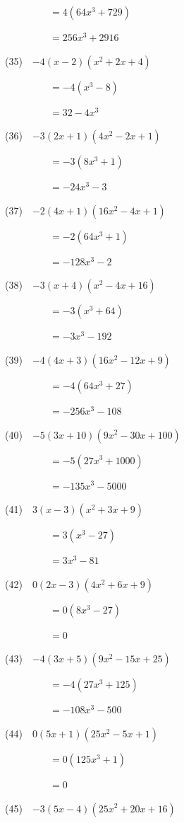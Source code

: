 \documentclass[a4j,twocolumn,10pt,fleqn]{jarticle}
\begin{document}
~~~~~~~~~$=4(64 x^{3} + 729)$

~~~~~~~~~$=256 x^{3} + 2916$

(35)~~$-4\left(x - 2\right) \left(x^{2} + 2 x + 4\right)$

~~~~~~~~~$=-4(x^{3} - 8)$

~~~~~~~~~$=32 - 4 x^{3}$

(36)~~$-3\left(2 x + 1\right) \left(4 x^{2} - 2 x + 1\right)$

~~~~~~~~~$=-3(8 x^{3} + 1)$

~~~~~~~~~$=- 24 x^{3} - 3$

(37)~~$-2\left(4 x + 1\right) \left(16 x^{2} - 4 x + 1\right)$

~~~~~~~~~$=-2(64 x^{3} + 1)$

~~~~~~~~~$=- 128 x^{3} - 2$

(38)~~$-3\left(x + 4\right) \left(x^{2} - 4 x + 16\right)$

~~~~~~~~~$=-3(x^{3} + 64)$

~~~~~~~~~$=- 3 x^{3} - 192$

(39)~~$-4\left(4 x + 3\right) \left(16 x^{2} - 12 x + 9\right)$

~~~~~~~~~$=-4(64 x^{3} + 27)$

~~~~~~~~~$=- 256 x^{3} - 108$

(40)~~$-5\left(3 x + 10\right) \left(9 x^{2} - 30 x + 100\right)$

~~~~~~~~~$=-5(27 x^{3} + 1000)$

~~~~~~~~~$=- 135 x^{3} - 5000$

(41)~~$3\left(x - 3\right) \left(x^{2} + 3 x + 9\right)$

~~~~~~~~~$=3(x^{3} - 27)$

~~~~~~~~~$=3 x^{3} - 81$

(42)~~$0\left(2 x - 3\right) \left(4 x^{2} + 6 x + 9\right)$

~~~~~~~~~$=0(8 x^{3} - 27)$

~~~~~~~~~$=0$

(43)~~$-4\left(3 x + 5\right) \left(9 x^{2} - 15 x + 25\right)$

~~~~~~~~~$=-4(27 x^{3} + 125)$

~~~~~~~~~$=- 108 x^{3} - 500$

(44)~~$0\left(5 x + 1\right) \left(25 x^{2} - 5 x + 1\right)$

~~~~~~~~~$=0(125 x^{3} + 1)$

~~~~~~~~~$=0$

(45)~~$-3\left(5 x - 4\right) \left(25 x^{2} + 20 x + 16\right)$
\end{document}
